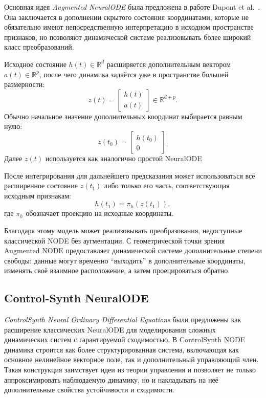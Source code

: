 \documentclass[PMI,VKR]{HSEUniversity}
\begin{document}
Основная идея \textit{Augmented NeuralODE} была предложена в работе
Dupont et al.~\cite{dupont2019augmented}. Она заключается в дополнении
скрытого состояния координатами, которые не обязательно имеют
непосредственную интерпретацию в исходном пространстве признаков, но
позволяют динамической системе реализовывать более широкий класс
преобразований.

Исходное состояние \(h(t)\in\mathbb{R}^d\) расширяется дополнительным
вектором \(a(t)\in\mathbb{R}^p\), после чего динамика задаётся уже в
пространстве большей размерности:
\[
z(t)=
\begin{bmatrix} 
    h(t)\\ a(t)
\end{bmatrix}
\in\mathbb{R}^{d+p}.
\]
Обычно начальное значение дополнительных координат выбирается равным
нулю:
\[
z(t_0)=
\begin{bmatrix}
    h(t_0) \\ 0
\end{bmatrix}.
\]
Далее \(z(t)\) используется как аналогично простой NeuralODE

После интегрирования для дальнейшего предсказания может использоваться
всё расширенное состояние \(z(t_1)\) либо только его часть,
соответствующая исходным признакам:
\[
h(t_1)=\pi_h(z(t_1)),
\]
где \(\pi_h\) обозначает проекцию на исходные координаты.

Благодаря этому модель может реализовывать преобразования, недоступные
классической NODE без аугментации. С геометрической точки зрения
Augmented NODE предоставляет динамической системе дополнительные
степени свободы: данные могут временно ``выходить'' в дополнительные
координаты, изменять своё взаимное расположение, а затем
проецироваться обратно.

\subsection{Control-Synth NeuralODE}

\textit{ControlSynth Neural Ordinary Differential Equations}\cite{mei2024controlsynthneuralodesmodeling} были предложены как расширение классических NeuralODE для моделирования сложных динамических систем с гарантируемой сходимостью. 
В ControlSynth NODE динамика строится как более структурированная система, включающая как основное нелинейное векторное поле, так и дополнительный управляющий член. 
Такая конструкция заимствует идеи из теории управления и позволяет не только аппроксимировать наблюдаемую динамику, но и накладывать на неё дополнительные свойства устойчивости и сходимости.
\end{document}
